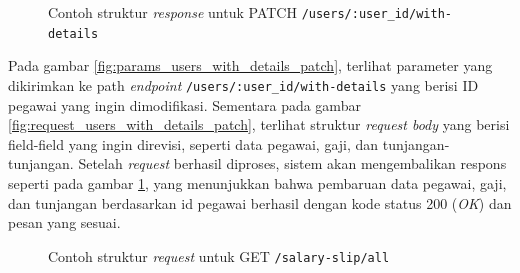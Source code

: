 \begin{figure}
    \centering
    \caption{Contoh struktur \textit{response} untuk PATCH \texttt{/users/{:user\_id}/with-details}}
    \label{fig:response_users_with_details_patch}
\end{figure}

Pada gambar \ref{fig:params_users_with_details_patch}, terlihat parameter yang dikirimkan ke path \textit{endpoint} \texttt{/users/{:user\_id}/with-details} yang berisi ID pegawai yang ingin dimodifikasi. Sementara pada gambar \ref{fig:request_users_with_details_patch}, terlihat struktur \textit{request body} yang berisi field-field yang ingin direvisi, seperti data pegawai, gaji, dan tunjangan-tunjangan. Setelah \textit{request} berhasil diproses, sistem akan mengembalikan respons seperti pada gambar \ref{fig:response_users_with_details_patch}, yang menunjukkan bahwa pembaruan data pegawai, gaji, dan tunjangan berdasarkan id pegawai berhasil dengan kode status 200 (\textit{OK}) dan pesan yang sesuai.


\begin{figure}
    \centering
    \caption{Contoh struktur \textit{request} untuk GET \texttt{/salary-slip/all}}
    \label{fig:request_salary_slip_all_get}
\end{figure}


